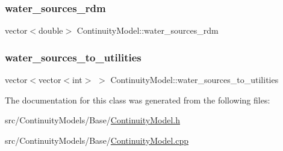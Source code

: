 \mbox{\label{classContinuityModel_ab7b8fa93a6f56b328e425e1ead6cfefa_ab7b8fa93a6f56b328e425e1ead6cfefa}} 
\subsubsection{\texorpdfstring{water\+\_\+sources\+\_\+rdm}{water\_sources\_rdm}}
{\footnotesize\ttfamily vector$<$double$>$ Continuity\+Model\+::water\+\_\+sources\+\_\+rdm\hspace{0.3cm}{\ttfamily [protected]}}

\mbox{\label{classContinuityModel_ae8516bcbbf52650190277fc8b06c1843_ae8516bcbbf52650190277fc8b06c1843}} 
\subsubsection{\texorpdfstring{water\+\_\+sources\+\_\+to\+\_\+utilities}{water\_sources\_to\_utilities}}
{\footnotesize\ttfamily vector$<$vector$<$int$>$ $>$ Continuity\+Model\+::water\+\_\+sources\+\_\+to\+\_\+utilities\hspace{0.3cm}{\ttfamily [protected]}}



The documentation for this class was generated from the following files\+:\begin{DoxyCompactItemize}
\item 
src/\+Continuity\+Models/\+Base/\mbox{\hyperlink{ContinuityModel_8h}{Continuity\+Model.\+h}}\item 
src/\+Continuity\+Models/\+Base/\mbox{\hyperlink{ContinuityModel_8cpp}{Continuity\+Model.\+cpp}}\end{DoxyCompactItemize}
